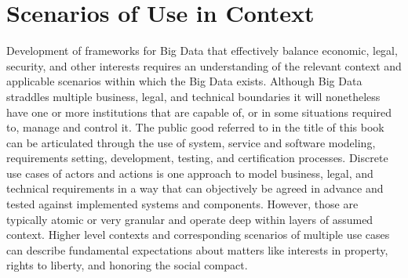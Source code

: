 \section{Scenarios of Use in Context }

Development of frameworks for Big Data that effectively balance economic, legal, security, and other interests requires an understanding of the relevant context and applicable scenarios within which the Big Data exists.
Although Big Data straddles multiple business, legal, and technical boundaries it will nonetheless have one or more institutions that are capable of, or in some situations required to, manage and control it.
The public good referred to in the title of this book can be articulated through the use of system, service and software modeling, requirements setting, development, testing, and certification processes. 
Discrete use cases of actors and actions is one approach to model business, legal, and technical requirements in a way that can objectively be agreed in advance and tested against implemented systems and components.
However, those are typically atomic or very granular and operate deep within layers of assumed context.
Higher level contexts and corresponding scenarios of multiple use cases can describe fundamental expectations about matters like interests in property, rights to liberty, and honoring the social compact. 

